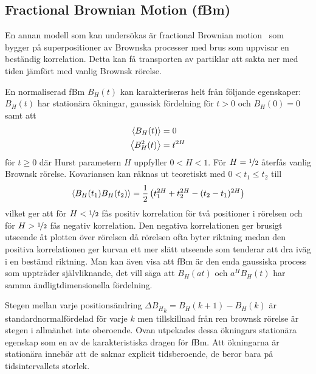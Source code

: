 \subsection{Fractional Brownian Motion (fBm)}

En annan modell som kan undersökas är fractional Brownian motion~\cite{Hofling&Franosch2013} som bygger på superpositioner av Brownska processer med brus som uppvisar en beständig korrelation. Detta kan få transporten av partiklar att sakta ner med tiden jämfört med vanlig Brownsk rörelse.

En normaliserad fBm $B_H(t)$ kan karakteriseras helt från följande egenskaper\cite{Dieker_fBm}: $B_H(t)$ har stationära ökningar, gaussisk fördelning för $t>0$ och $B_H(0)=0$ samt att
\begin{align}
    \ev{B_H(t)}&=0 \\
    \ev{B^2_H(t)}&=t^{2H}
\end{align}
för $t\geq 0$ där Hurst parametern $H$ uppfyller $0< H <1$. För $H=\nicefrac{1}{2}$ återfås vanlig Brownsk rörelse. Kovariansen kan räknas ut teoretiskt med $0<
t_1\leq t_2$ till
\begin{equation}
\ev{B_H(t_1)B_H(t_2)}
= \frac{1}{2} \left(t_1^{2H}+t_2^{2H}-(t_2-t_1)^{2H}\right)
\end{equation}
vilket ger att för $H<\nicefrac{1}{2}$ fås positiv korrelation för två positioner i rörelsen och för  $H>\nicefrac{1}{2}$ fås negativ korrelation. Den negativa korrelationen ger brusigt utseende åt plotten över rörelsen då rörelsen ofta byter riktning medan den positiva korrelationen ger kurvan ett mer slätt utseende som tenderar att dra iväg i en bestämd riktning. Man kan även visa att fBm är den enda gaussiska process som uppträder självliknande, det vill säga att $B_H(at)$ och $a^H B_H(t)$ har samma ändligtdimensionella fördelning.

Stegen mellan varje positionsändring $\Delta{B_H}_k=B_H(k+1)-B_H(k)$ är standardnormalfördelad för varje $k$ men tillskillnad från ren brownsk rörelse är stegen i allmänhet inte oberoende. Ovan utpekades dessa ökningars  stationära egenskap som en av de karakteristiska dragen för fBm. Att ökningarna är stationära innebär att de saknar explicit tidsberoende, de beror bara på tidsintervallets storlek.

    




